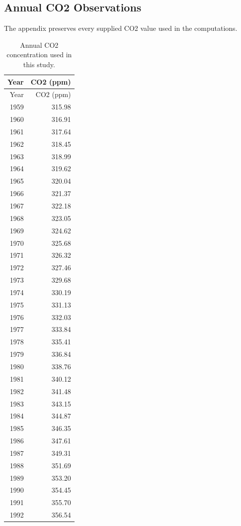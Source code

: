 \documentclass{mcmthesis}
\begin{document}
\begin{appendices}
\section{Annual CO2 Observations}
The appendix preserves every supplied CO2 value used in the computations.
\begin{longtable}{rr}
\caption{Annual CO2 concentration used in this study.}\\
\toprule Year & CO2 (ppm) \\ \midrule
\endfirsthead
\toprule Year & CO2 (ppm) \\ \midrule
\endhead
1959 & 315.98 \\
1960 & 316.91 \\
1961 & 317.64 \\
1962 & 318.45 \\
1963 & 318.99 \\
1964 & 319.62 \\
1965 & 320.04 \\
1966 & 321.37 \\
1967 & 322.18 \\
1968 & 323.05 \\
1969 & 324.62 \\
1970 & 325.68 \\
1971 & 326.32 \\
1972 & 327.46 \\
1973 & 329.68 \\
1974 & 330.19 \\
1975 & 331.13 \\
1976 & 332.03 \\
1977 & 333.84 \\
1978 & 335.41 \\
1979 & 336.84 \\
1980 & 338.76 \\
1981 & 340.12 \\
1982 & 341.48 \\
1983 & 343.15 \\
1984 & 344.87 \\
1985 & 346.35 \\
1986 & 347.61 \\
1987 & 349.31 \\
1988 & 351.69 \\
1989 & 353.20 \\
1990 & 354.45 \\
1991 & 355.70 \\
1992 & 356.54 \\

\end{longtable}
\end{appendices}
\end{document}
